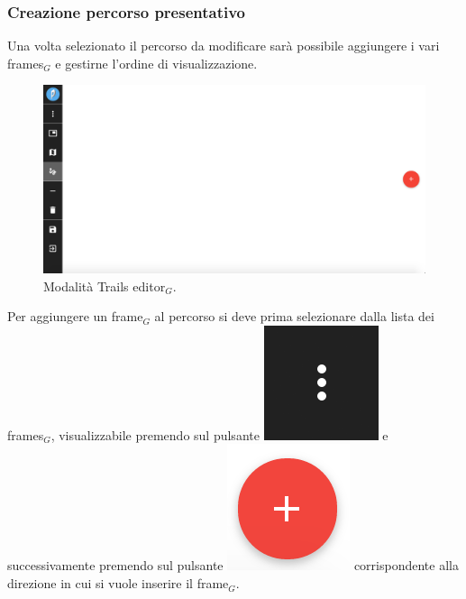 \subsubsection{Creazione percorso presentativo}
Una volta selezionato il percorso da modificare sarà possibile aggiungere i vari frames$_G$ e gestirne l'ordine di visualizzazione.

\begin{figure}[!h]
\begin{center}
\includegraphics[scale=0.35]{img/edit_trail.png}
\caption{Modalità Trails editor$_G$.}
\end{center}
\end{figure}

Per aggiungere un frame$_G$ al percorso si deve prima selezionare dalla lista dei frames$_G$, visualizzabile premendo sul pulsante \includegraphics[scale=0.4]{img/frames_to_be_added.png} e successivamente premendo sul pulsante \includegraphics[scale=0.4]{img/add.png} corrispondente alla direzione in cui si vuole inserire il frame$_G$.\\

